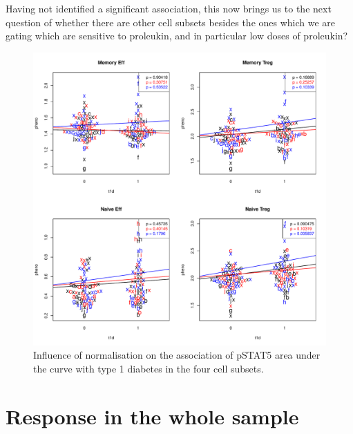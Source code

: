 Having not identified a significant association, this now brings us to the next question of whether there are other
cell subsets besides the ones which we are gating which are sensitive to proleukin, and in particular low doses of proleukin?

\begin{figure}[h]
    \centering
    \includegraphics[scale=.5]{IL2/figures/pstat5-auc-t1d-celltypes.pdf}
    { Influence of normalisation on the association of pSTAT5 area under the curve with type 1 diabetes in the four cell subsets. }
    { }
\end{figure}

\section{Response in the whole sample}

